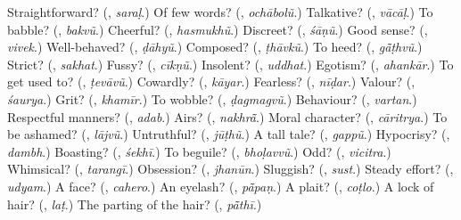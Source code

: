 \begin{tcolorbox}[breakable,colback=teal!4,colframe=teal!35!black,title={Before you move on}]
Straightforward? (\textbf{}, \emph{saraḷ}.) Of few words? (\textbf{}, \emph{ochābolũ}.) Talkative? (\textbf{}, \emph{vācāḷ}.) To babble? (\textbf{}, \emph{bakvũ}.) Cheerful? (\textbf{}, \emph{hasmukhũ}.) Discreet? (\textbf{}, \emph{śāṇũ}.) Good sense? (\textbf{}, \emph{vivek}.) Well-behaved? (\textbf{}, \emph{ḍāhyũ}.) Composed? (\textbf{}, \emph{ṭhāvkũ}.) To heed? (\textbf{}, \emph{gā̃ṭhvũ}.) Strict? (\textbf{}, \emph{sakhat}.) Fussy? (\textbf{}, \emph{cīkṇũ}.) Insolent? (\textbf{}, \emph{uddhat}.) Egotism? (\textbf{}, \emph{ahankār}.) To get used to? (\textbf{}, \emph{ṭevāvũ}.) Cowardly? (\textbf{}, \emph{kāyar}.) Fearless? (\textbf{}, \emph{nīḍar}.) Valour? (\textbf{}, \emph{śaurya}.) Grit? (\textbf{}, \emph{khamīr}.) To wobble? (\textbf{}, \emph{ḍagmagvũ}.) Behaviour? (\textbf{}, \emph{vartan}.) Respectful manners? (\textbf{}, \emph{adab}.) Airs? (\textbf{}, \emph{nakhrā̃}.) Moral character? (\textbf{}, \emph{cāritrya}.) To be ashamed? (\textbf{}, \emph{lājvũ}.) Untruthful? (\textbf{}, \emph{jūṭhũ}.) A tall tale? (\textbf{}, \emph{gappũ}.) Hypocrisy? (\textbf{}, \emph{dambh}.) Boasting? (\textbf{}, \emph{śekhī}.) To beguile? (\textbf{}, \emph{bhoḷavvũ}.) Odd? (\textbf{}, \emph{vicitra}.) Whimsical? (\textbf{}, \emph{tarangī}.) Obsession? (\textbf{}, \emph{jhanūn}.) Sluggish? (\textbf{}, \emph{sust}.) Steady effort? (\textbf{}, \emph{udyam}.) A face? (\textbf{}, \emph{cahero}.) An eyelash? (\textbf{}, \emph{pā̃paṇ}.) A plait? (\textbf{}, \emph{coṭlo}.) A lock of hair? (\textbf{}, \emph{laṭ}.) The parting of the hair? (\textbf{}, \emph{pā̃thī}.)
\end{tcolorbox}
